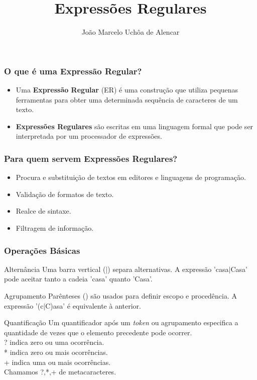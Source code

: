 \documentclass{beamer}
\title{Expressões Regulares}
\author[João Marcelo Uchôa de Alencar]{João Marcelo Uchôa de Alencar}
\institute{Universidade Federal do Ceará - Quixadá}
\begin{document}
   \begin{frame}
      \titlepage
   \end{frame}

   \begin{frame}
      \frametitle{O que é uma Expressão Regular?}
      \begin{itemize}
         \item Uma \textbf{Expressão Regular} (ER) é uma construção que utiliza pequenas ferramentas para obter uma determinada sequência de caracteres de um texto. 
         \item \textbf{Expressões Regulares} são escritas em uma linguagem formal que pode ser interpretada por um processador de expressões. 
      \end{itemize}
   \end{frame}

   \begin{frame}
      \frametitle{Para quem servem Expressões Regulares?}
      \begin{itemize}
         \item Procura e substituição de textos em editores e linguagens de programação.
         \item Validação de formatos de texto.
         \item Realce de sintaxe.
         \item Filtragem de informação. 
      \end{itemize}
   \end{frame}

   \begin{frame}
      \frametitle{Operações Básicas}
      \begin{block}{Alternância}
      Uma barra vertical ($|$) separa alternativas. A expressão 'casa$|$Casa' pode aceitar tanto a cadeia 'casa' quanto 'Casa'.
      \end{block}
      
      \begin{block}{Agrupamento}
      Parênteses () são usados para definir escopo e procedência. A expressão '(c$|$C)asa' é equivalente à anterior.
      \end{block}
      
      \begin{block}{Quantificação}
      Um quantificador após um \textit{token} ou agrupamento especifica a quantidade de vezes que o elemento precedente pode ocorrer. \\
      ? indica zero ou uma ocorrência. \\
      * indica zero ou mais ocorrências. \\
      + indica uma ou mais ocorrências. \\
      Chamamos ?,*,+ de metacaracteres.
      \end{block}
   \end{frame}
\end{document}
